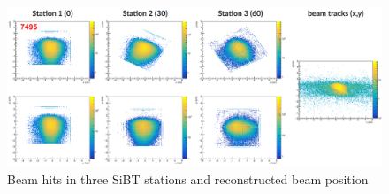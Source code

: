     \begin{figure}[H]
        \begin{center}
            \includegraphics[width=0.9\linewidth]{../pict/QA_RunByRun_24.12/SiBT.png}
            \vspace{-3mm}
            \caption{Beam hits in three SiBT stations and reconstructed beam position}
            \label{fig:SiBT}
        \end{center}
        \vspace{-5mm}
    \end{figure}

